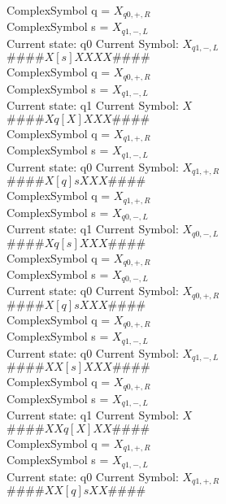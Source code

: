 \documentclass[10pt, a4paper]{article}
\begin{document}
ComplexSymbol q = $X_{q0,+,R}$ \\
ComplexSymbol s = $X_{q1,-,L}$ \\ 
 \medskip
Current state: q0	 Current Symbol: 	 $X_{q1,-,L}$\\
$\# \#\# \# X [ s ] X X X X \# \# \# \# $ \\
ComplexSymbol q = $X_{q0,+,R}$ \\
ComplexSymbol s = $X_{q1,-,L}$ \\ 
 \medskip
Current state: q1	 Current Symbol: 	 $X$\\
$\# \#\# \# X q [ X ] X X X \# \# \# \# $ \\
ComplexSymbol q = $X_{q1,+,R}$ \\
ComplexSymbol s = $X_{q1,-,L}$ \\ 
 \medskip
Current state: q0	 Current Symbol: 	 $X_{q1,+,R}$\\
$\# \#\# \# X [ q ] s X X X \# \# \# \# $ \\
ComplexSymbol q = $X_{q1,+,R}$ \\
ComplexSymbol s = $X_{q0,-,L}$ \\ 
 \medskip
Current state: q1	 Current Symbol: 	 $X_{q0,-,L}$\\
$\# \#\# \# X q [ s ] X X X \# \# \# \# $ \\
ComplexSymbol q = $X_{q0,+,R}$ \\
ComplexSymbol s = $X_{q0,-,L}$ \\ 
 \medskip
Current state: q0	 Current Symbol: 	 $X_{q0,+,R}$\\
$\# \#\# \# X [ q ] s X X X \# \# \# \# $ \\
ComplexSymbol q = $X_{q0,+,R}$ \\
ComplexSymbol s = $X_{q1,-,L}$ \\ 
 \medskip
Current state: q0	 Current Symbol: 	 $X_{q1,-,L}$\\
$\# \#\# \# X X [ s ] X X X \# \# \# \# $ \\
ComplexSymbol q = $X_{q0,+,R}$ \\
ComplexSymbol s = $X_{q1,-,L}$ \\ 
 \medskip
Current state: q1	 Current Symbol: 	 $X$\\
$\# \#\# \# X X q [ X ] X X \# \# \# \# $ \\
ComplexSymbol q = $X_{q1,+,R}$ \\
ComplexSymbol s = $X_{q1,-,L}$ \\ 
 \medskip
Current state: q0	 Current Symbol: 	 $X_{q1,+,R}$\\
$\# \#\# \# X X [ q ] s X X \# \# \# \# $ \\
\end{document}
